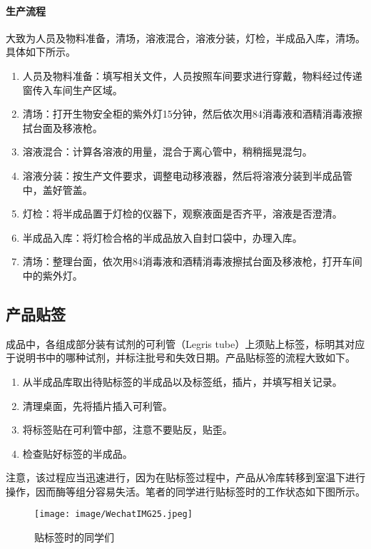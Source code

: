 \paragraph{生产流程} 大致为人员及物料准备，清场，溶液混合，溶液分装，灯检，半成品入库，清场。具体如下所示。
\begin{enumerate}
    \item 人员及物料准备：填写相关文件，人员按照车间要求进行穿戴，物料经过传递窗传入车间生产区域。
    \item 清场：打开生物安全柜的紫外灯15分钟，然后依次用84消毒液和酒精消毒液擦拭台面及移液枪。
    \item 溶液混合：计算各溶液的用量，混合于离心管中，稍稍摇晃混匀。
    \item 溶液分装：按生产文件要求，调整电动移液器，然后将溶液分装到半成品管中，盖好管盖。
    \item 灯检：将半成品置于灯检的仪器下，观察液面是否齐平，溶液是否澄清。
    \item 半成品入库：将灯检合格的半成品放入自封口袋中，办理入库。
    \item 清场：整理台面，依次用84消毒液和酒精消毒液擦拭台面及移液枪，打开车间中的紫外灯。
\end{enumerate}

\subsection{产品贴签}
成品中，各组成部分装有试剂的可利管（Legris tube）上须贴上标签，标明其对应于说明书中的哪种试剂，并标注批号和失效日期。产品贴标签的流程大致如下。

\begin{enumerate}
    \item 从半成品库取出待贴标签的半成品以及标签纸，插片，并填写相关记录。
    \item 清理桌面，先将插片插入可利管。
    \item 将标签贴在可利管中部，注意不要贴反，贴歪。
    \item 检查贴好标签的半成品。
\end{enumerate}
注意，该过程应当迅速进行，因为在贴标签过程中，产品从冷库转移到室温下进行操作，因而酶等组分容易失活。笔者的同学进行贴标签时的工作状态如下图所示。

\begin{figure}[H]
    \centering
    \texttt{[image: image/WechatIMG25.jpeg]}
    \caption{贴标签时的同学们}
    \label{STAFF}
\end{figure}

